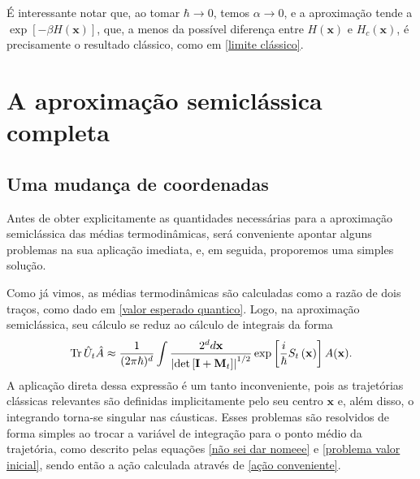 \documentclass[
	12pt,
	oneside,			%
	a4paper,			%
	english,			%
	brazil				%
	]{abntex2}
\theoremstyle{definition}
\begin{document}
É interessante notar que, ao tomar $\hbar \to 0$, temos $\alpha \to 0$, e a aproximação tende a $\exp\left[-\beta H(\mathbf{x}) \right]$, que, a menos da possível diferença entre $H(\mathbf{x})$ e $H_c(\mathbf{x})$, é precisamente o resultado clássico, como em \eqref{limite clássico}.

\section{A aproximação semiclássica completa}

\subsection{Uma mudança de coordenadas}
\label{Uma mudança de coordenadas}

Antes de obter explicitamente as quantidades necessárias para a aproximação semiclássica das médias termodinâmicas, será conveniente apontar alguns problemas na sua aplicação imediata, e, em seguida, proporemos uma simples solução.

Como já vimos, as médias termodinâmicas são calculadas como a razão de dois traços, como dado em \eqref{valor esperado quantico}. Logo, na aproximação semiclássica, seu cálculo se reduz ao cálculo de integrais da forma
\begin{equation}
\label{valor esperado importante}
    \Tr \hat{U}_t \hat{A} \approx \frac{1}{(2\pi \hbar)^d}\int \frac{2^dd \mathbf{x}}{\left|\det \left[ \mathbf{I} + \mathbf{M}_{t}\right] \right|^{1/2} } \exp \left[ \frac{i}{\hbar} S_t \left(\mathbf{x} \right) \right] A(\mathbf{x}).
\end{equation}
A aplicação direta dessa expressão é um tanto inconveniente, pois as trajetórias clássicas relevantes são definidas implicitamente pelo seu centro $\mathbf{x}$ e, além disso, 
o integrando torna-se singular nas cáusticas. Esses problemas são resolvidos de forma simples ao trocar a variável de integração para o ponto médio da trajetória, como descrito pelas equações \eqref{não sei dar nomeee} e \eqref{problema valor inicial}, sendo então a ação calculada através de \eqref{ação conveniente}.
\end{document}
